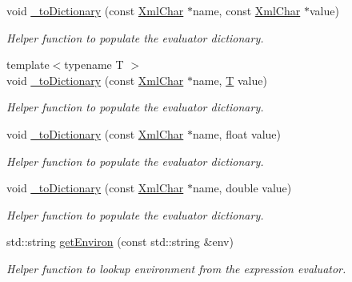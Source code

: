 \begin{DoxyCompactItemize}
void \hyperlink{group___d_d4_h_e_p___x_m_l_ga453206d36ab8257b39337846e5a1795d}{\+\_\+to\+Dictionary} (const \hyperlink{namespace_d_d4hep_1_1_x_m_l_a09e5d9cc86ed782f6826dfe0778c1815}{Xml\+Char} $\ast$name, const \hyperlink{namespace_d_d4hep_1_1_x_m_l_a09e5d9cc86ed782f6826dfe0778c1815}{Xml\+Char} $\ast$value)
\begin{DoxyCompactList}\small\item\em Helper function to populate the evaluator dictionary. \end{DoxyCompactList}\item 
{\footnotesize template$<$typename T $>$ }\\void \hyperlink{group___d_d4_h_e_p___x_m_l_ga50eac63a7d1b9077d329298a55c23d5e}{\+\_\+to\+Dictionary} (const \hyperlink{namespace_d_d4hep_1_1_x_m_l_a09e5d9cc86ed782f6826dfe0778c1815}{Xml\+Char} $\ast$name, \hyperlink{class_t}{T} value)
\begin{DoxyCompactList}\small\item\em Helper function to populate the evaluator dictionary. \end{DoxyCompactList}\item 
void \hyperlink{group___d_d4_h_e_p___x_m_l_gac7be63582e2bd7ad2bad66544cb45ede}{\+\_\+to\+Dictionary} (const \hyperlink{namespace_d_d4hep_1_1_x_m_l_a09e5d9cc86ed782f6826dfe0778c1815}{Xml\+Char} $\ast$name, float value)
\begin{DoxyCompactList}\small\item\em Helper function to populate the evaluator dictionary. \end{DoxyCompactList}\item 
void \hyperlink{group___d_d4_h_e_p___x_m_l_ga7a346eee87fe45320da3ebb2e1958af5}{\+\_\+to\+Dictionary} (const \hyperlink{namespace_d_d4hep_1_1_x_m_l_a09e5d9cc86ed782f6826dfe0778c1815}{Xml\+Char} $\ast$name, double value)
\begin{DoxyCompactList}\small\item\em Helper function to populate the evaluator dictionary. \end{DoxyCompactList}\item 
std\+::string \hyperlink{namespace_d_d4hep_1_1_x_m_l_ab30d4d75e9d1cb30b2488b650836bdeb}{get\+Environ} (const std\+::string \&env)
\begin{DoxyCompactList}\small\item\em Helper function to lookup environment from the expression evaluator. \end{DoxyCompactList}\item 

\end{DoxyCompactItemize}
